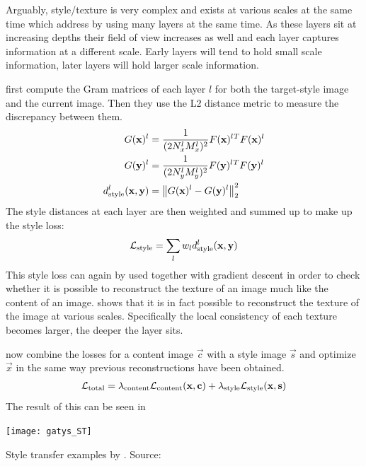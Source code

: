 Arguably, style/texture is very complex and exists at various scales at the same time which \citeauthor*{gatys} address by using many layers at the same time.
As these layers sit at increasing depths their field of view increases as well and each layer captures information at a different scale.
Early layers will tend to hold small scale information, later layers will hold larger scale information.

\citeauthor*{gatys} first compute the Gram matrices of each layer $l$ for both the target-style image and the current image.
Then they use the L2 distance metric to measure the discrepancy between them.
\begin{align}
    G(\mathbf{x})^l & = \frac{1}{(2 N_x^l M_x^l)^2} F(\mathbf{x})^l{}^T F(\mathbf{x})^l \\
    G(\mathbf{y})^l & = \frac{1}{(2 N_y^l M_y^l)^2} F(\mathbf{y})^l{}^T F(\mathbf{y})^l \\
    d_{\text{style}}^l(\mathbf{x}, \mathbf{y}) & = \left\lVert G(\mathbf{x})^l - G(\mathbf{y})^l\right\rVert^2_2 \\
\end{align}
The style distances at each layer are then weighted and summed up to make up the style loss:
\begin{align}
    \mathcal{L}_{\text{style}} = \sum_{l} w_l d_{\text{style}}^l(\mathbf{x}, \mathbf{y})
\end{align}
This style loss can again by used together with gradient descent in order to check whether it is possible to reconstruct the texture of an image much like the content of an image.
 shows that it is in fact possible to reconstruct the texture of the image at various scales.
Specifically the local consistency of each texture becomes larger, the deeper the layer sits.

\citeauthor*{gatys} now combine the losses for a content image $\vec{c}$ with a style image $\vec{s}$ and optimize $\vec{x}$ in the same way previous reconstructions have been obtained.
\begin{align}
    \mathcal{L}_{\text{total}} = \lambda_{\text{content}} \mathcal{L}_{\text{content}}(\mathbf{x}, \mathbf{c}) + \lambda_{\text{style}} \mathcal{L}_{\text{style}}(\mathbf{x}, \mathbf{s})
\end{align}
The result of this can be seen in 
\begin{marginfigure}
    \texttt{[image: gatys\_ST]}
    \caption[]{Style transfer examples by \citeauthor*{gatys}. Source:~\cite{gatys}}
\end{marginfigure}

